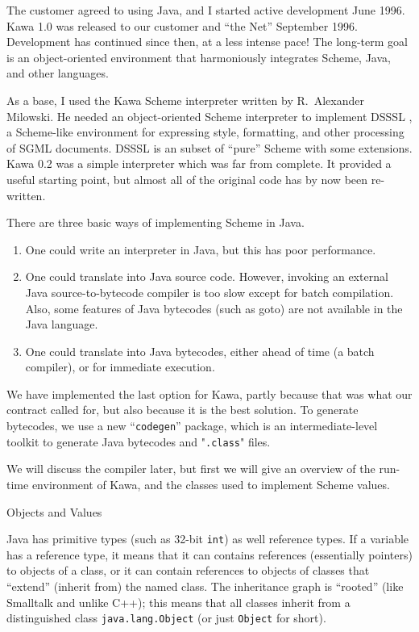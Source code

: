 \documentclass[twocolumn]{article}
\makeatletter
\def\section{\@startsection {section}{1}{\z@}
   {14pt plus 2pt minus 2pt}{12pt plus 2pt minus 2pt} {\large\bf}}
\makeatother
\begin{document}
The customer agreed to using Java, and I started active development June 1996.
Kawa 1.0 was released to our customer and ``the Net'' September 1996.
Development has continued since then, at a less intense pace!
The long-term goal is an object-oriented environment
that harmoniously integrates Scheme, Java, and other languages.

As a base, I used the Kawa Scheme interpreter written
by R.~Alexander Milowski.  He needed an object-oriented
Scheme interpreter to implement DSSSL \cite{DSSSL},
a Scheme-like environment for expressing style, formatting,
and other processing of SGML \cite{SGML} documents.
DSSSL is an subset of ``pure'' Scheme with some extensions.
Kawa 0.2 was a simple interpreter which was far from
complete.  It provided a useful starting point, but almost all
of the original code has by now been re-written.

There are three basic ways of implementing Scheme in Java.
\begin{enumerate}
\item One could write an interpreter in Java, but this has
poor performance.
\item One could translate into Java source code.  However,
invoking an external Java source-to-bytecode compiler is
too slow except for batch compilation.  Also, some features
of Java bytecodes (such as goto) are not available in the
Java language.
\item One could translate into Java bytecodes, either ahead
of time (a batch compiler), or for immediate execution.
\end{enumerate}

We have implemented the last option for Kawa,
partly because that was what our contract called for, but also because
it is the best solution.  To generate
bytecodes, we use a new ``{\tt codegen}'' package, which is an
intermediate-level toolkit to generate Java bytecodes and
"{\tt .class}" files.

We will discuss the compiler later, but first we will give an
overview of the run-time environment of Kawa, and the
classes used to implement Scheme values.

\section{Objects and Values}

Java \cite{JavaSpec} has primitive types (such as 32-bit {\tt int}) as well
reference types.  If a variable has a reference type, it means that it can
contains references (essentially pointers) to objects of a class,
or it can contain references to objects of classes that ``extend''
(inherit from) the named class.  
The inheritance graph is ``rooted'' (like Smalltalk and unlike C++);
this means that all classes inherit from a distinguished class
{\tt java.lang.Object} (or just {\tt Object} for short).
\end{document}
